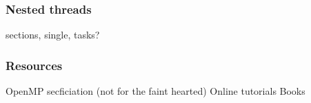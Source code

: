 \documentclass{beamer}
\begin{document}
\begin{frame}
\frametitle{Nested threads}
sections, single, tasks?
\end{frame}

\begin{frame}
\frametitle{Resources}
OpenMP secficiation (not for the faint hearted)
Online tutorials
Books
\end{frame}

\end{document}
